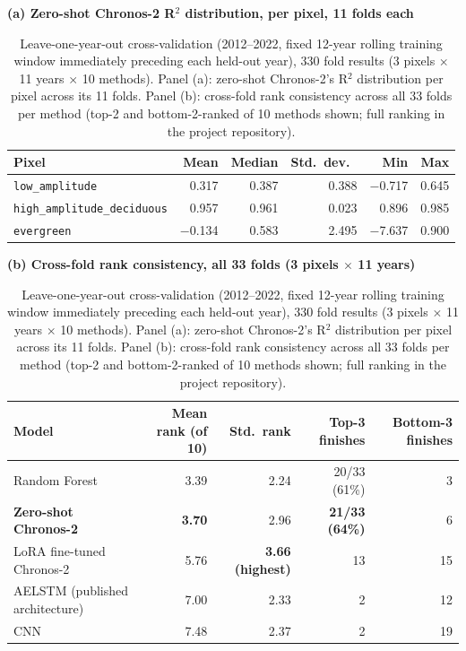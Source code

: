 \begin{table}[t]
\centering
\caption{Leave-one-year-out cross-validation (2012--2022, fixed 12-year rolling training window
immediately preceding each held-out year), 330 fold results (3 pixels $\times$ 11 years
$\times$ 10 methods). Panel (a): zero-shot Chronos-2's R$^2$ distribution per pixel across its 11
folds. Panel (b): cross-fold rank consistency across all 33 folds per method (top-2 and
bottom-2-ranked of 10 methods shown; full ranking in the project repository).}
\label{tab:loyo}
\begin{minipage}{\textwidth}
\centering
\textbf{(a) Zero-shot Chronos-2 R$^2$ distribution, per pixel, 11 folds each}\\[0.3em]
\begin{tabular}{@{}lrrrrr@{}}
\toprule
Pixel & Mean & Median & Std.\ dev.\ & Min & Max \\
\midrule
\texttt{low\_amplitude} & 0.317 & 0.387 & 0.388 & $-$0.717 & 0.645 \\
\texttt{high\_amplitude\_deciduous} & 0.957 & 0.961 & 0.023 & 0.896 & 0.985 \\
\texttt{evergreen} & $-$0.134 & 0.583 & 2.495 & $-$7.637 & 0.900 \\
\bottomrule
\end{tabular}

\vspace{1em}
\textbf{(b) Cross-fold rank consistency, all 33 folds (3 pixels $\times$ 11 years)}\\[0.3em]
\begin{tabular}{@{}lrrrr@{}}
\toprule
Model & Mean rank (of 10) & Std.\ rank & Top-3 finishes & Bottom-3 finishes \\
\midrule
Random Forest & 3.39 & 2.24 & 20/33 (61\%) & 3 \\
\textbf{Zero-shot Chronos-2} & \textbf{3.70} & 2.96 & \textbf{21/33 (64\%)} & 6 \\
LoRA fine-tuned Chronos-2 & 5.76 & \textbf{3.66 (highest)} & 13 & 15 \\
AELSTM (published architecture) & 7.00 & 2.33 & 2 & 12 \\
CNN & 7.48 & 2.37 & 2 & 19 \\
\bottomrule
\end{tabular}
\end{minipage}
\end{table}

